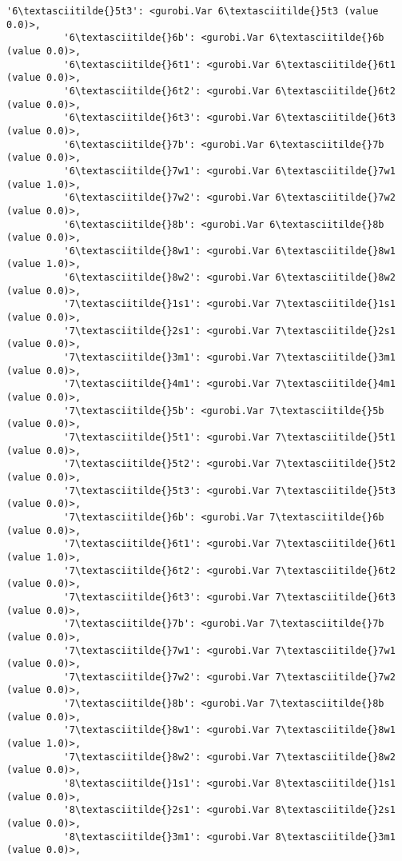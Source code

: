 \documentclass[11pt]{article}
\begin{document}
\begin{Verbatim}[commandchars=\\\{\}]
          '6\textasciitilde{}5t3': <gurobi.Var 6\textasciitilde{}5t3 (value 0.0)>,
          '6\textasciitilde{}6b': <gurobi.Var 6\textasciitilde{}6b (value 0.0)>,
          '6\textasciitilde{}6t1': <gurobi.Var 6\textasciitilde{}6t1 (value 0.0)>,
          '6\textasciitilde{}6t2': <gurobi.Var 6\textasciitilde{}6t2 (value 0.0)>,
          '6\textasciitilde{}6t3': <gurobi.Var 6\textasciitilde{}6t3 (value 0.0)>,
          '6\textasciitilde{}7b': <gurobi.Var 6\textasciitilde{}7b (value 0.0)>,
          '6\textasciitilde{}7w1': <gurobi.Var 6\textasciitilde{}7w1 (value 1.0)>,
          '6\textasciitilde{}7w2': <gurobi.Var 6\textasciitilde{}7w2 (value 0.0)>,
          '6\textasciitilde{}8b': <gurobi.Var 6\textasciitilde{}8b (value 0.0)>,
          '6\textasciitilde{}8w1': <gurobi.Var 6\textasciitilde{}8w1 (value 1.0)>,
          '6\textasciitilde{}8w2': <gurobi.Var 6\textasciitilde{}8w2 (value 0.0)>,
          '7\textasciitilde{}1s1': <gurobi.Var 7\textasciitilde{}1s1 (value 0.0)>,
          '7\textasciitilde{}2s1': <gurobi.Var 7\textasciitilde{}2s1 (value 0.0)>,
          '7\textasciitilde{}3m1': <gurobi.Var 7\textasciitilde{}3m1 (value 0.0)>,
          '7\textasciitilde{}4m1': <gurobi.Var 7\textasciitilde{}4m1 (value 0.0)>,
          '7\textasciitilde{}5b': <gurobi.Var 7\textasciitilde{}5b (value 0.0)>,
          '7\textasciitilde{}5t1': <gurobi.Var 7\textasciitilde{}5t1 (value 0.0)>,
          '7\textasciitilde{}5t2': <gurobi.Var 7\textasciitilde{}5t2 (value 0.0)>,
          '7\textasciitilde{}5t3': <gurobi.Var 7\textasciitilde{}5t3 (value 0.0)>,
          '7\textasciitilde{}6b': <gurobi.Var 7\textasciitilde{}6b (value 0.0)>,
          '7\textasciitilde{}6t1': <gurobi.Var 7\textasciitilde{}6t1 (value 1.0)>,
          '7\textasciitilde{}6t2': <gurobi.Var 7\textasciitilde{}6t2 (value 0.0)>,
          '7\textasciitilde{}6t3': <gurobi.Var 7\textasciitilde{}6t3 (value 0.0)>,
          '7\textasciitilde{}7b': <gurobi.Var 7\textasciitilde{}7b (value 0.0)>,
          '7\textasciitilde{}7w1': <gurobi.Var 7\textasciitilde{}7w1 (value 0.0)>,
          '7\textasciitilde{}7w2': <gurobi.Var 7\textasciitilde{}7w2 (value 0.0)>,
          '7\textasciitilde{}8b': <gurobi.Var 7\textasciitilde{}8b (value 0.0)>,
          '7\textasciitilde{}8w1': <gurobi.Var 7\textasciitilde{}8w1 (value 1.0)>,
          '7\textasciitilde{}8w2': <gurobi.Var 7\textasciitilde{}8w2 (value 0.0)>,
          '8\textasciitilde{}1s1': <gurobi.Var 8\textasciitilde{}1s1 (value 0.0)>,
          '8\textasciitilde{}2s1': <gurobi.Var 8\textasciitilde{}2s1 (value 0.0)>,
          '8\textasciitilde{}3m1': <gurobi.Var 8\textasciitilde{}3m1 (value 0.0)>,

\end{Verbatim}
\end{document}

